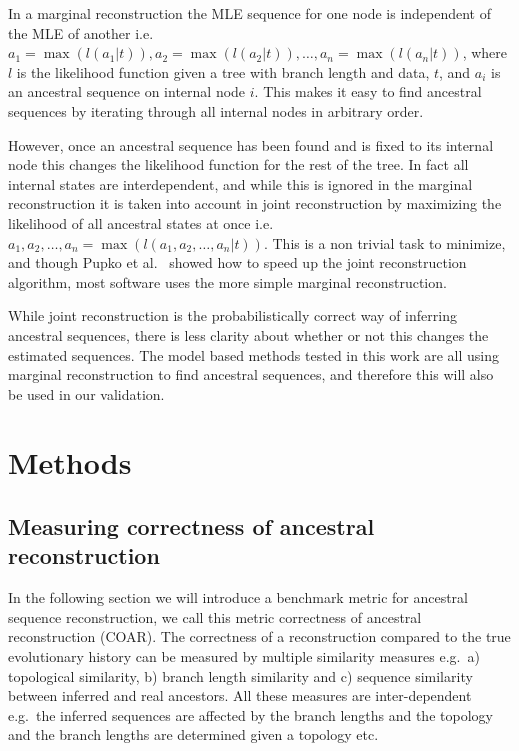 In a marginal reconstruction the MLE sequence for one node is independent of the MLE of another i.e.\ $a_1 = \operatorname{max}(l(a_1 | t)), a_2 = \operatorname{max}(l(a_2 | t)), \hdots, a_n = \operatorname{max}(l(a_n | t))$, where $l$ is the likelihood function given a tree with branch length and data, $t$, and $a_i$ is an ancestral sequence on internal node $i$.
This makes it easy to find ancestral sequences by iterating through all internal nodes in arbitrary order.

However, once an ancestral sequence has been found and is fixed to its internal node this changes the likelihood function for the rest of the tree.
In fact all internal states are interdependent, and while this is ignored in the marginal reconstruction it is taken into account in joint reconstruction by maximizing the likelihood of all ancestral states at once i.e.\ $a_1, a_2, \hdots, a_n = \operatorname{max}(l(a_1, a_2, \hdots, a_n | t))$.
This is a non trivial task to minimize, and though Pupko et al.\ \cite{pupko2000fast} showed how to speed up the joint reconstruction algorithm, most software uses the more simple marginal reconstruction.

While joint reconstruction is the probabilistically correct way of inferring ancestral sequences, there is less clarity about whether or not this changes the estimated sequences.
The model based methods tested in this work are all using marginal reconstruction to find ancestral sequences, and therefore this will also be used in our validation.






\section{Methods}

\subsection{Measuring correctness of ancestral reconstruction}
In the following section we will introduce a benchmark metric for ancestral sequence reconstruction, we call this metric correctness of ancestral reconstruction (COAR).
The correctness of a reconstruction compared to the true evolutionary history can be measured by multiple similarity measures e.g.\ a) topological similarity, b) branch length similarity and c) sequence similarity between inferred and real ancestors.
All these measures are inter-dependent e.g.\ the inferred sequences are affected by the branch lengths and the topology and the branch lengths are determined given a topology etc.

